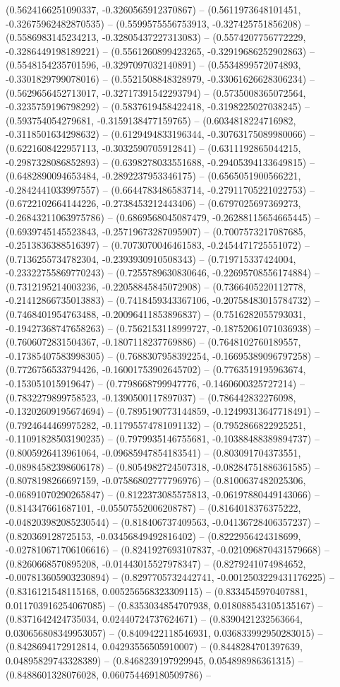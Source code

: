 (0.5624166251090337, -0.3260565912370867) -- (0.5611973648101451, -0.32675962482870535) -- (0.5599575556753913, -0.327425751856208) -- (0.5586983145234213, -0.32805437227313083) -- (0.5574207756772229, -0.3286449198189221) -- (0.5561260899423265, -0.32919686252902863) -- (0.5548154235701596, -0.3297097032140891) -- (0.5534899572074893, -0.3301829799078016) -- (0.5521508848328979, -0.33061626628306234) -- (0.5629656452713017, -0.32717391542293794) -- (0.5735008365072564, -0.3235759196798292) -- (0.5837619458422418, -0.3198225027038245) -- (0.593754054279681, -0.3159138477159765) -- (0.6034818224716982, -0.3118501634298632) -- (0.6129494833196344, -0.30763175089980066) -- (0.6221608422957113, -0.3032590705912841) -- (0.6311192865044215, -0.2987328086852893) -- (0.6398278033551688, -0.29405394133649815) -- (0.6482890094653484, -0.2892237953346175) -- (0.6565051900566221, -0.2842441033997557) -- (0.6644783486583714, -0.27911705221022753) -- (0.6722102664144226, -0.2738453212443406) -- (0.6797025697369273, -0.26843211063975786) -- (0.6869568045087479, -0.26288115654665445) -- (0.6939745145523843, -0.25719673287095907) -- (0.7007573217087685, -0.2513836388516397) -- (0.7073070046461583, -0.2454471725551072) -- (0.7136255734782304, -0.2393930910508343) -- (0.719715337424004, -0.23322755869770243) -- (0.7255789630830646, -0.22695708556174884) -- (0.7312195214003236, -0.22058845845072908) -- (0.7366405220112778, -0.21412866735013883) -- (0.7418459343367106, -0.20758483015784732) -- (0.7468401954763488, -0.20096411853896837) -- (0.7516282055793031, -0.19427368747658263) -- (0.7562153118999727, -0.18752061071036938) -- (0.7606072831504367, -0.1807118237769886) -- (0.7648102760189557, -0.17385407583998305) -- (0.7688307958392254, -0.16695389096797258) -- (0.7726756533794426, -0.16001753902645702) -- (0.7763519195963674, -0.153051015919647) -- (0.7798668799947776, -0.1460600325727214) -- (0.7832279899758523, -0.1390500117897037) -- (0.786442832276098, -0.13202609195674694) -- (0.7895190773144859, -0.12499313647718491) -- (0.7924644469975282, -0.11795574781091132) -- (0.7952866822925251, -0.11091828503190235) -- (0.7979935146755681, -0.10388488389894737) -- (0.8005926413961064, -0.09685947854183541) -- (0.803091704373551, -0.08984582398606178) -- (0.8054982724507318, -0.08284751886361585) -- (0.8078198266697159, -0.07586802777796976) -- (0.8100637482025306, -0.06891070290265847) -- (0.8122373085575813, -0.06197880449143066) -- (0.814347661687101, -0.05507552006208787) -- (0.8164018376375222, -0.048203982085230544) -- (0.818406737409563, -0.04136728406357237) -- (0.820369128725153, -0.03456849492816402) -- (0.8222956424318699, -0.027810671706106616) -- (0.8241927693107837, -0.021096870431579668) -- (0.8260668570895208, -0.01443015527978347) -- (0.8279241074984652, -0.007813605903230894) -- (0.8297705732442741, -0.0012503229431176225) -- (0.8316121548115168, 0.005256568323309115) -- (0.8334545970407881, 0.011703916254067085) -- (0.8353034854707938, 0.018088543105135167) -- (0.8371642424735034, 0.02440724737624671) -- (0.8390421232563664, 0.030656808349953057) -- (0.8409422118546931, 0.036833992950283015) -- (0.8428694172912814, 0.04293556505910007) -- (0.8448284701397639, 0.04895829743328389) -- (0.8468239197929945, 0.054898986361315) -- (0.8488601328076028, 0.060754469180509786) -- 